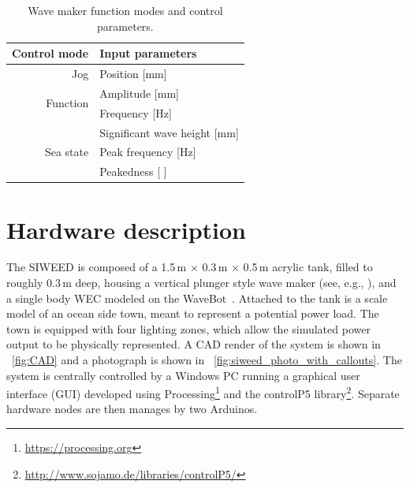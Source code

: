 \documentclass[11pt, letterpaper]{article}
\begin{document}
\begin{table}[tb]
  \caption{Wave maker function modes and control parameters.}
  \label{tab:wave_maker_controls}
  \centering

  \begin{tabular}{rl}
  \hline
  \textbf{Control mode}      & \textbf{Input parameters}        \\
  \hline
  Jog                        & Position {[}mm{]}                \\
  \hline
  \multirow{2}{*}{Function}  & Amplitude {[}mm{]}               \\
                             & Frequency {[}Hz{]}               \\
  \hline
  \multirow{3}{*}{Sea state} & Significant wave height {[}mm{]} \\
                             & Peak frequency {[}Hz{]}          \\
                             & Peakedness {[} {]}               \\       
  \hline
  \end{tabular}
\end{table}

\section{Hardware description} %
The SIWEED is composed of a 1.5\,m $\times{}$ 0.3\,m $\times{}$ 0.5\,m acrylic tank, filled to roughly 0.3\,m deep, housing a vertical plunger style wave maker (see, e.g., \cite{hyun1976simplified}), and a single body WEC modeled on the WaveBot~\cite{Coe2016a}.
Attached to the tank is a scale model of an ocean side town, meant to represent a potential power load.
The town is equipped with four lighting zones, which allow the simulated power output to be physically represented.
A CAD render of the system is shown in \figurename~\ref{fig:CAD} and a photograph is shown in \figurename~\ref{fig:siweed_photo_with_callouts}.
The system is centrally controlled by a Windows PC running a graphical user interface (GUI) developed using Processing\footnote{\url{https://processing.org}} and the controlP5 library\footnote{\url{http://www.sojamo.de/libraries/controlP5/}}.
Separate hardware nodes are then manages by two Arduinos.
\end{document}
